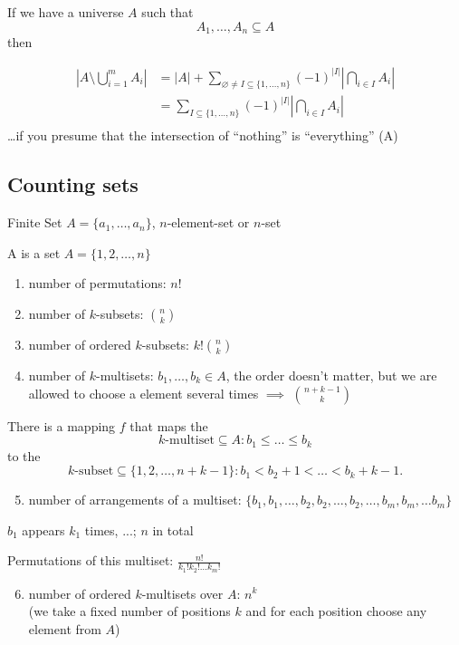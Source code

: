 If we have a universe $A$ such that
\[
  A_1,\ldots,A_n \subseteq A
\]then

\begin{align*}
  |A\setminus \bigcup\limits_{i=1}^m A_i| &=
  |A| + \sum_{\varnothing\neq I\subseteq\{1,\ldots,n\}}
    (-1)^{|I|}
    \left| \bigcap_{i\in I} A_i \right| \\
  &= \sum_{I\subseteq\{1,\ldots,n\}}
    (-1)^{|I|}
    \left| \bigcap_{i\in I} A_i \right| \\
\end{align*}
\dots if you presume that the intersection of ``nothing'' is ``everything'' (A)

\subsection{Counting sets}
Finite Set $A = \{a_1, \ldots, a_n\}$, $n$-element-set or $n$-set

A  is a set $A = \{1, 2, \ldots, n\}$

\begin{enumerate}
  \item number of permutations: $n!$
  \item number of $k$-subsets: ${n\choose k}$
  \item number of ordered $k$-subsets: $k! {n\choose k}$
  \item number of $k$-multisets: $b_1, \ldots, b_k \in A$, the order doesn't matter, but we are allowed to choose a element several times $\implies$ ${n +k-1 \choose k}$
\end{enumerate}

There is a mapping $f$ that maps the
\[
  \text{$k$-multiset}
  \subseteq A:
  b_1 ≤ \ldots ≤ b_k
\]
to the
\[
  \text{$k$-subset}
  \subseteq \{1,2,\ldots,n+k-1\}:
  b_1 < b_2+1 < \ldots < b_k+k-1.
\]

\begin{enumerate}
  \setcounter{enumi}{4}
  \item number of arrangements of a multiset: $\{b_1, b_1, \ldots , b_2, b_2,\ldots, b_2, \ldots, b_m, b_m, \ldots b_m\}$
\end{enumerate}

$b_1$ appears $k_1$ times, ...; $n$ in total

Permutations of this multiset:
$\frac{n!}{k_1! k_2! \ldots k_m!}$

\begin{enumerate}
  \setcounter{enumi}{5}
  \item number of ordered $k$-multisets over $A$: $n^k$ \\
  (we take a fixed number of positions $k$ and for each position choose any element from $A$)
\end{enumerate}


